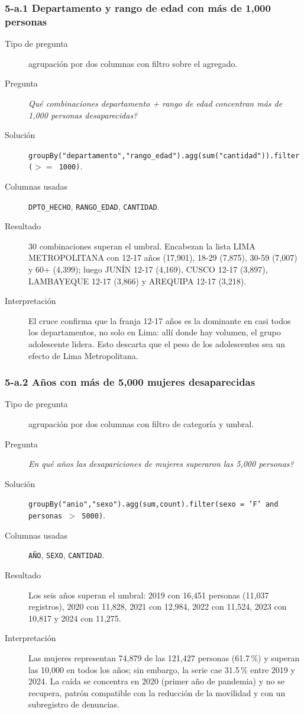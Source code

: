 \subsubsection*{5-a.1 \textbar{} Departamento y rango de edad con m\'as de 1,000 personas}
\begin{description}
\item[Tipo de pregunta] agrupaci\'on por dos columnas con filtro sobre el agregado.
\item[Pregunta] \emph{Qu\'e combinaciones departamento + rango de edad concentran m\'as de 1,000
      personas desaparecidas?}
\item[Soluci\'on] \texttt{groupBy("departamento","rango\_edad").agg(sum("cantidad")).filter($>=$ 1000)}.
\item[Columnas usadas] \texttt{DPTO\_HECHO}, \texttt{RANGO\_EDAD}, \texttt{CANTIDAD}.
\item[Resultado] 30 combinaciones superan el umbral. Encabezan la lista LIMA METROPOLITANA con
      12-17 a\~nos (17,901), 18-29 (7,875), 30-59 (7,007) y 60+ (4,399); luego JUN\'IN 12-17
      (4,169), CUSCO 12-17 (3,897), LAMBAYEQUE 12-17 (3,866) y AREQUIPA 12-17 (3,218).
\item[Interpretaci\'on] El cruce confirma que la franja 12-17 a\~nos es la dominante en casi
      todos los departamentos, no solo en Lima: all\'i donde hay volumen, el grupo adolescente
      lidera. Esto descarta que el peso de los adolescentes sea un efecto de Lima Metropolitana.
\end{description}

\subsubsection*{5-a.2 \textbar{} A\~nos con m\'as de 5,000 mujeres desaparecidas}
\begin{description}
\item[Tipo de pregunta] agrupaci\'on por dos columnas con filtro de categor\'ia y umbral.
\item[Pregunta] \emph{En qu\'e a\~nos las desapariciones de mujeres superaron las 5,000 personas?}
\item[Soluci\'on] \texttt{groupBy("anio","sexo").agg(sum,count).filter(sexo = 'F' and personas $>$ 5000)}.
\item[Columnas usadas] \texttt{A\~NO}, \texttt{SEXO}, \texttt{CANTIDAD}.
\item[Resultado] Los seis a\~nos superan el umbral: 2019 con 16,451 personas (11,037 registros),
      2020 con 11,828, 2021 con 12,984, 2022 con 11,524, 2023 con 10,817 y 2024 con 11,275.
\item[Interpretaci\'on] Las mujeres representan 74,879 de las 121,427 personas (61.7\,\%) y
      superan las 10,000 en todos los a\~nos; sin embargo, la serie cae 31.5\,\% entre 2019 y
      2024. La ca\'ida se concentra en 2020 (primer a\~no de pandemia) y no se recupera, patr\'on
      compatible con la reducci\'on de la movilidad y con un subregistro de denuncias.
\end{description}


